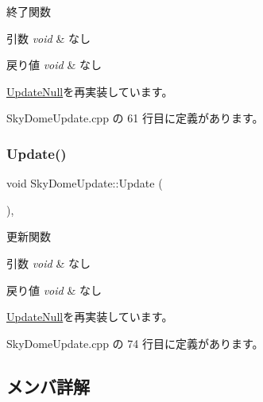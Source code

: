 終了関数 


\begin{DoxyParams}{引数}
{\em void} & なし \\
\hline
\end{DoxyParams}

\begin{DoxyRetVals}{戻り値}
{\em void} & なし \\
\hline
\end{DoxyRetVals}


\mbox{\hyperlink{class_update_null_a820189d686ec62f7a30d547118c419df}{Update\+Null}}を再実装しています。



 Sky\+Dome\+Update.\+cpp の 61 行目に定義があります。

\mbox{\label{class_sky_dome_update_ae163cb90e4de561fe1f7b2cb311be331}} 
\subsubsection{\texorpdfstring{Update()}{Update()}}
{\footnotesize\ttfamily void Sky\+Dome\+Update\+::\+Update (\begin{DoxyParamCaption}{ }\end{DoxyParamCaption})\hspace{0.3cm}{\ttfamily [override]}, {\ttfamily [virtual]}}



更新関数 


\begin{DoxyParams}{引数}
{\em void} & なし \\
\hline
\end{DoxyParams}

\begin{DoxyRetVals}{戻り値}
{\em void} & なし \\
\hline
\end{DoxyRetVals}


\mbox{\hyperlink{class_update_null_ab3f9cabc6ddcb4ef8743f212c26be144}{Update\+Null}}を再実装しています。



 Sky\+Dome\+Update.\+cpp の 74 行目に定義があります。



\subsection{メンバ詳解}
\mbox{\label{class_sky_dome_update_a4c6750a54880db753cfe2a4ecfd24130}} 
